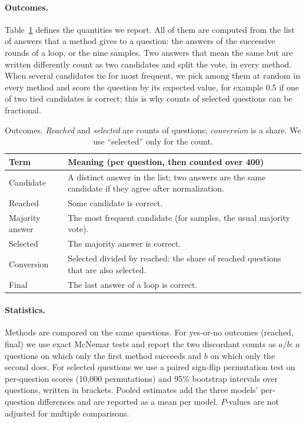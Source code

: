\documentclass[11pt]{article}
\begin{document}
\paragraph{Outcomes.}
Table~\ref{tab:terms} defines the quantities we report.
All of them are computed from the list of answers that a method gives to a question: the answers of the successive rounds of a loop, or the nine samples.
Two answers that mean the same but are written differently count as two candidates and split the vote, in every method.
When several candidates tie for most frequent, we pick among them at random in every method and score the question by its expected value, for example 0.5 if one of two tied candidates is correct; this is why counts of selected questions can be fractional.

\begin{table}[t]
\centering
\small
\setlength{\tabcolsep}{3pt}
\begin{tabular}{@{}lp{5.6cm}@{}}
\toprule
Term & Meaning (per question, then counted over 400) \\
\midrule
Candidate & A distinct answer in the list; two answers are the same candidate if they agree after normalization. \\
Reached & Some candidate is correct. \\
Majority answer & The most frequent candidate (for samples, the usual majority vote). \\
Selected & The majority answer is correct. \\
Conversion & Selected divided by reached: the share of reached questions that are also selected. \\
Final & The last answer of a loop is correct. \\
\bottomrule
\end{tabular}
\caption{Outcomes. \emph{Reached} and \emph{selected} are counts of questions; \emph{conversion} is a share. We use ``selected'' only for the count.}
\label{tab:terms}
\end{table}

\paragraph{Statistics.}
Methods are compared on the same questions.
For yes-or-no outcomes (reached, final) we use exact McNemar tests and report the two discordant counts as $a/b$: $a$ questions on which only the first method succeeds and $b$ on which only the second does.
For selected questions we use a paired sign-flip permutation test on per-question scores (10{,}000 permutations) and 95\% bootstrap intervals over questions, written in brackets.
Pooled estimates add the three models' per-question differences and are reported as a mean per model.
$P$-values are not adjusted for multiple comparisons.
\end{document}
